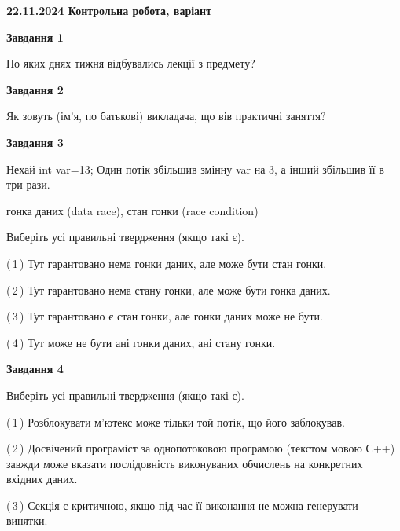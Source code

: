 \documentclass[12pt, ukrainian]{article}
\begin{document}
\begin {large}

\textbf{22.11.2024 Контрольна робота, варіант  }\par


{

\begin{center}
\textbf{Завдання 1}
\end{center}

По яких днях тижня відбувались лекції з предмету?


\begin{center}
\textbf{Завдання 2}
\end{center}

Як зовуть (ім'я, по батькові) викладача, що вів практичні заняття?


\begin{center}
\textbf{Завдання 3}
\end{center}

Нехай int var=13; Один потік збільшив змінну var на 3, а інший збільшив її в три рази.

гонка даних (data race), стан гонки (race condition)

Виберіть усі правильні твердження (якщо такі є).\par
\vspace{2mm}
(\,1\,) Тут гарантовано нема гонки даних, але може бути стан гонки.%

(\,2\,) Тут гарантовано нема стану гонки, але може бути гонка даних.%

(\,3\,) Тут гарантовано є стан гонки, але гонки даних може не бути.%

(\,4\,) Тут може не бути ані гонки даних, ані стану гонки.%


\begin{center}
\textbf{Завдання 4}
\end{center}

Виберіть усі правильні твердження (якщо такі є).\par
\vspace{2mm}

(\,1\,) Розблокувати м’ютекс може тільки той потік, що його заблокував.%

(\,2\,) Досвічений програміст за однопотоковою програмою (текстом мовою С++) завжди може вказати послідовність виконуваних обчислень на конкретних вхідних даних.%

(\,3\,) Секція є критичною, якщо під час її виконання не можна генерувати винятки.%

}
\end{large}
\end{document}
